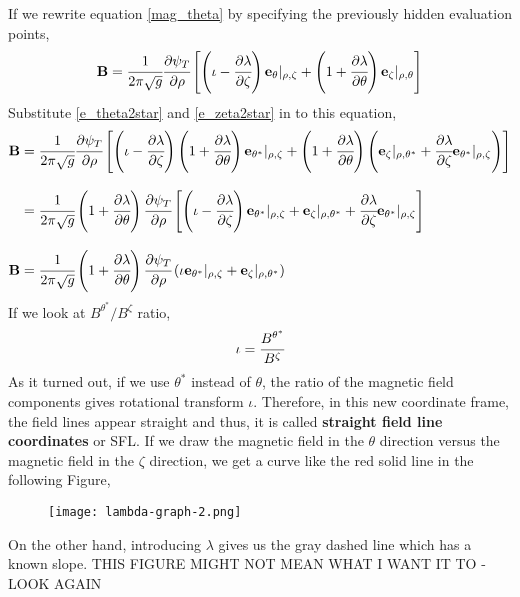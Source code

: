 If we rewrite equation \ref{mag_theta} by specifying the previously hidden evaluation points,
\begin{equation}
    \mathbf{B} = \cfrac{1}{2\pi\sqrt{g}}\cfrac{\partial \psi_{T}}{\partial \rho}\begin{bmatrix}
        \left(\iota - \cfrac{\partial \lambda}{\partial \zeta}\right)\mathbf{e}_{\theta}|_{\rho,\zeta} + \left(1 + \cfrac{\partial \lambda}{\partial \theta}\right) \mathbf{e}_\zeta|_{\rho,\theta}
    \end{bmatrix}   \label{mag_theta_at} 
\end{equation}
Substitute \ref{e_theta2star} and \ref{e_zeta2star} in to this equation,
\begin{equation}
    \begin{split}
        \mathbf{B} &= \cfrac{1}{2\pi\sqrt{g}}\cfrac{\partial \psi_{T}}{\partial \rho}\begin{bmatrix}
            \left(\iota - \cfrac{\partial \lambda}{\partial \zeta}\right)\left(1+\cfrac{\partial \lambda}{\partial \theta}\right)\mathbf{e}_{\theta^*}|_{\rho,\zeta} + \left(1 + \cfrac{\partial \lambda}{\partial \theta}\right) \left(\mathbf{e}_\zeta |_{\rho,\theta^*} + \cfrac{\partial \lambda}{\partial \zeta} \mathbf{e}_{\theta^*} |_{\rho,\zeta}\right)
        \end{bmatrix}   \\[0.3cm]
        &= \cfrac{1}{2\pi\sqrt{g}}\left(1+\cfrac{\partial \lambda}{\partial \theta}\right)\cfrac{\partial \psi_{T}}{\partial \rho}\begin{bmatrix}
            \left(\iota - \cfrac{\partial \lambda}{\partial \zeta}\right)\mathbf{e}_{\theta^*}|_{\rho,\zeta} + \mathbf{e}_\zeta |_{\rho,\theta^*} + \cfrac{\partial \lambda}{\partial \zeta} \mathbf{e}_{\theta^*} |_{\rho,\zeta}
        \end{bmatrix}  \\[0.3cm]
        \mathbf{B} &= \cfrac{1}{2\pi\sqrt{g}}\left(1+\cfrac{\partial \lambda}{\partial \theta}\right)\cfrac{\partial \psi_{T}}{\partial \rho}\left(            \iota  \mathbf{e}_{\theta^*}|_{\rho,\zeta} + \mathbf{e}_\zeta |_{\rho,\theta^*} \right)    \label{SFL-mag}
    \end{split}
\end{equation}
If we look at $B^{\theta^*}/B^{\zeta}$ ratio,
\begin{equation}
     \iota = \cfrac{B^{\theta^*}}{B^{\zeta}}
\end{equation}
As it turned out, if we use $\theta^*$ instead of $\theta$, the ratio of the magnetic field components gives rotational transform $\iota$. Therefore, in this new coordinate frame, the field lines appear straight and thus, it is called \textbf{straight field line coordinates} or SFL. If we draw the magnetic field in the $\theta$ direction versus the magnetic field in the $\zeta$ direction, we get a curve like the red solid line in the following Figure, 
\begin{figure}[H]
    \centering
    \texttt{[image: lambda-graph-2.png]}
    \label{fig:enter-label}
\end{figure}
On the other hand, introducing $\lambda$ gives us the gray dashed line which has a known slope. {\color{red} THIS FIGURE MIGHT NOT MEAN WHAT I WANT IT TO - LOOK AGAIN}




